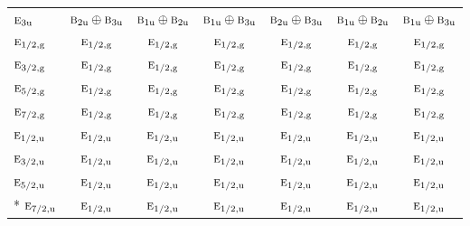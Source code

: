 \documentclass[10pt,a4paper]{article}
\numberwithin{equation}{section}
\newcommand{\irr}[1]{\text{\normalfont\scshape #1}}
\newcommand{\ptag}[1]{\mathrm{#1}}
\begin{document}
{\begin{longtable}{@{}lcccccc@{}}
$\irr{e}_{3\ptag{u}}$ & $\irr{b}_{2\ptag{u}}\oplus \irr{b}_{3\ptag{u}}$ & $\irr{b}_{1\ptag{u}}\oplus \irr{b}_{2\ptag{u}}$ & $\irr{b}_{1\ptag{u}}\oplus \irr{b}_{3\ptag{u}}$ & $\irr{b}_{2\ptag{u}}\oplus \irr{b}_{3\ptag{u}}$ & $\irr{b}_{1\ptag{u}}\oplus \irr{b}_{2\ptag{u}}$ & $\irr{b}_{1\ptag{u}}\oplus \irr{b}_{3\ptag{u}}$\\
$\irr{e}_{1/2,\ptag{g}}$ & $\irr{e}_{1/2,\ptag{g}}$ & $\irr{e}_{1/2,\ptag{g}}$ & $\irr{e}_{1/2,\ptag{g}}$ & $\irr{e}_{1/2,\ptag{g}}$ & $\irr{e}_{1/2,\ptag{g}}$ & $\irr{e}_{1/2,\ptag{g}}$\\
$\irr{e}_{3/2,\ptag{g}}$ & $\irr{e}_{1/2,\ptag{g}}$ & $\irr{e}_{1/2,\ptag{g}}$ & $\irr{e}_{1/2,\ptag{g}}$ & $\irr{e}_{1/2,\ptag{g}}$ & $\irr{e}_{1/2,\ptag{g}}$ & $\irr{e}_{1/2,\ptag{g}}$\\
$\irr{e}_{5/2,\ptag{g}}$ & $\irr{e}_{1/2,\ptag{g}}$ & $\irr{e}_{1/2,\ptag{g}}$ & $\irr{e}_{1/2,\ptag{g}}$ & $\irr{e}_{1/2,\ptag{g}}$ & $\irr{e}_{1/2,\ptag{g}}$ & $\irr{e}_{1/2,\ptag{g}}$\\
$\irr{e}_{7/2,\ptag{g}}$ & $\irr{e}_{1/2,\ptag{g}}$ & $\irr{e}_{1/2,\ptag{g}}$ & $\irr{e}_{1/2,\ptag{g}}$ & $\irr{e}_{1/2,\ptag{g}}$ & $\irr{e}_{1/2,\ptag{g}}$ & $\irr{e}_{1/2,\ptag{g}}$\\
$\irr{e}_{1/2,\ptag{u}}$ & $\irr{e}_{1/2,\ptag{u}}$ & $\irr{e}_{1/2,\ptag{u}}$ & $\irr{e}_{1/2,\ptag{u}}$ & $\irr{e}_{1/2,\ptag{u}}$ & $\irr{e}_{1/2,\ptag{u}}$ & $\irr{e}_{1/2,\ptag{u}}$\\
$\irr{e}_{3/2,\ptag{u}}$ & $\irr{e}_{1/2,\ptag{u}}$ & $\irr{e}_{1/2,\ptag{u}}$ & $\irr{e}_{1/2,\ptag{u}}$ & $\irr{e}_{1/2,\ptag{u}}$ & $\irr{e}_{1/2,\ptag{u}}$ & $\irr{e}_{1/2,\ptag{u}}$\\
$\irr{e}_{5/2,\ptag{u}}$ & $\irr{e}_{1/2,\ptag{u}}$ & $\irr{e}_{1/2,\ptag{u}}$ & $\irr{e}_{1/2,\ptag{u}}$ & $\irr{e}_{1/2,\ptag{u}}$ & $\irr{e}_{1/2,\ptag{u}}$ & $\irr{e}_{1/2,\ptag{u}}$\\*
$\irr{e}_{7/2,\ptag{u}}$ & $\irr{e}_{1/2,\ptag{u}}$ & $\irr{e}_{1/2,\ptag{u}}$ & $\irr{e}_{1/2,\ptag{u}}$ & $\irr{e}_{1/2,\ptag{u}}$ & $\irr{e}_{1/2,\ptag{u}}$ & $\irr{e}_{1/2,\ptag{u}}$\\
\bottomrule\end{longtable}}
\end{document}
